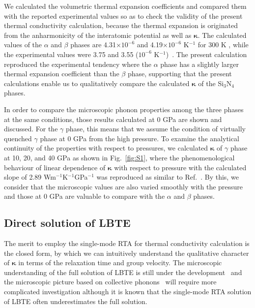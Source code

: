 \documentclass[twocolumn,amsmath,amssymb,a4paper,prb,superscriptaddress,floatfix]{revtex4-1}
\begin{document}
We calculated the volumetric thermal expansion coefficients and compared them
with the reported experimental values so as to check the validity of the
present thermal conductivity calculation, because the thermal expansion is
originated from the anharmonicity of the interatomic potential as well as
$\boldsymbol{\kappa}$. The calculated values of the $\alpha$ and $\beta$ phases
are 4.31$\times 10^{-6}$ and 4.19$\times 10^{-6}$ K$^{-1}$ for 300 K , while
the experimental values were 3.75 and 3.55 ($10^{-6}$
K$^{-1}$)~\cite{minikayev-alpha}. The present calculation reproduced the
experimental tendency where the $\alpha$ phase has a slightly larger thermal
expansion coefficient than the $\beta$ phase, supporting that the present
calculations enable us to qualitatively compare the calculated
$\boldsymbol{\kappa}$ of the Si$_3$N$_4$ phases.

In order to compare the microscopic phonon properties among the three phases at
the same conditions, those results calculated at 0 GPa are shown and discussed.
For the $\gamma$ phase, this means that we assume the condition of virtually
quenched $\gamma$ phase at 0 GPa from the high pressure. To examine the
analytical continuity of the properties with respect to pressures, we
calculated $\boldsymbol{\kappa}$ of $\gamma$ phase at 10, 20, and 40 GPa as shown in
Fig.~\ref{fig:S1}, where the phenomenological behaviour of linear dependence of
$\boldsymbol{\kappa}$ with respect to pressure with the calculated slope of 2.89
Wm$^{-1}$K$^{-1}$GPa$^{-1}$ was reproduced as similar to
Ref.~. By this, we consider that the microscopic
values are also varied smoothly with the pressure and those at 0 GPa are
valuable to compare with the $\alpha$ and $\beta$ phases.

\subsection{Direct solution of LBTE}

The merit to employ the single-mode RTA for thermal conductivity calculation is
the closed form, by which we can intuitively understand the qualitative
character of $\boldsymbol{\kappa}$ in terms of the relaxation time and group velocity. The
microscopic understanding of the full solution of LBTE is still under the
development~\cite{cepellotti-relaxons} and the microscopic picture based on
collective phonons~\cite{hardy-collective} will require more complicated
investigation although it is known that the single-mode RTA solution of LBTE
often underestimates the full solution.~\cite{mukhopadhyay-ltc,ward-ltc}
\end{document}
